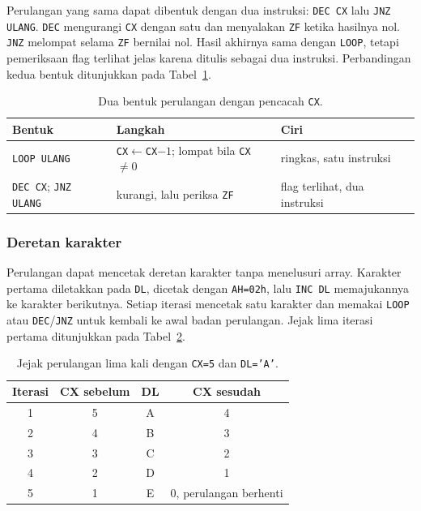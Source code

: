Perulangan yang sama dapat dibentuk dengan dua instruksi:
\texttt{DEC CX} lalu \texttt{JNZ ULANG}. \texttt{DEC} mengurangi
\texttt{CX} dengan satu dan menyalakan \texttt{ZF} ketika hasilnya
nol. \texttt{JNZ} melompat selama \texttt{ZF} bernilai nol. Hasil
akhirnya sama dengan \texttt{LOOP}, tetapi pemeriksaan flag terlihat
jelas karena ditulis sebagai dua instruksi. Perbandingan kedua bentuk
ditunjukkan pada Tabel~\ref{tab:m05-bentuk}.

\begin{table}[H]
    \centering
    \caption{Dua bentuk perulangan dengan pencacah \texttt{CX}.}
    \label{tab:m05-bentuk}
    \small
    \begin{tabular}{@{}lll@{}}
        \toprule
        \textbf{Bentuk} & \textbf{Langkah} & \textbf{Ciri} \\
        \midrule
        \texttt{LOOP ULANG} & \texttt{CX}$\leftarrow$\texttt{CX}$-1$;
        lompat bila \texttt{CX}$\neq0$ & ringkas, satu instruksi \\
        \texttt{DEC CX}; \texttt{JNZ ULANG} &
        kurangi, lalu periksa \texttt{ZF} & flag terlihat, dua instruksi \\
        \bottomrule
    \end{tabular}
\end{table}

\subsubsection*{Deretan karakter}

Perulangan dapat mencetak deretan karakter tanpa menelusuri array.
Karakter pertama diletakkan pada \texttt{DL}, dicetak dengan
\texttt{AH=02h}, lalu \texttt{INC DL} memajukannya ke karakter
berikutnya. Setiap iterasi mencetak satu karakter dan memakai
\texttt{LOOP} atau \texttt{DEC}/\texttt{JNZ} untuk kembali ke awal
badan perulangan. Jejak lima iterasi pertama ditunjukkan pada
Tabel~\ref{tab:m05-jejak}.

\begin{table}[H]
    \centering
    \caption{Jejak perulangan lima kali dengan \texttt{CX=5} dan
    \texttt{DL='A'}.}
    \label{tab:m05-jejak}
    \small
    \begin{tabular}{@{}cccc@{}}
        \toprule
        \textbf{Iterasi} & \textbf{CX sebelum} & \textbf{DL} &
        \textbf{CX sesudah} \\
        \midrule
        1 & 5 & A & 4 \\
        2 & 4 & B & 3 \\
        3 & 3 & C & 2 \\
        4 & 2 & D & 1 \\
        5 & 1 & E & 0, perulangan berhenti \\
        \bottomrule
    \end{tabular}
\end{table}

